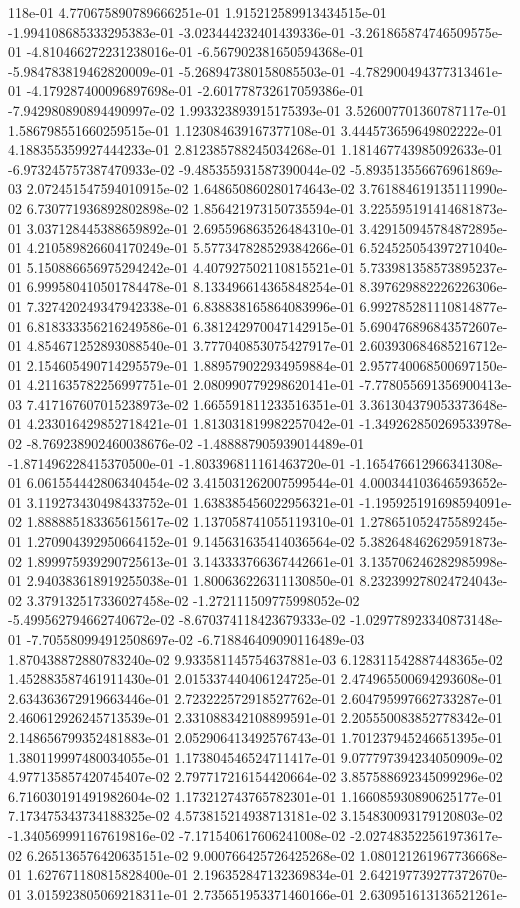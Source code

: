 118e-01	4.770675890789666251e-01	1.915212589913434515e-01	-1.994108685333295383e-01	-3.023444232401439336e-01	-3.261865874746509575e-01	-4.810466272231238016e-01	-6.567902381650594368e-01	-5.984783819462820009e-01	-5.268947380158085503e-01	-4.782900494377313461e-01	-4.179287400096897698e-01	-2.601778732617059386e-01	-7.942980890894490997e-02	1.993323893915175393e-01	3.526007701360787117e-01	1.586798551660259515e-01	1.123084639167377108e-01	3.444573659649802222e-01	4.188355359927444233e-01	2.812385788245034268e-01	1.181467743985092633e-01	-6.973245757387470933e-02	-9.485355931587390044e-02	-5.893513556676961869e-03	2.072451547594010915e-02	1.648650860280174643e-02	3.761884619135111990e-02	6.730771936892802898e-02	1.856421973150735594e-01	3.225595191414681873e-01	3.037128445388659892e-01	2.695596863526484310e-01	3.429150945784872895e-01	4.210589826604170249e-01	5.577347828529384266e-01	6.524525054397271040e-01	5.150886656975294242e-01	4.407927502110815521e-01	5.733981358573895237e-01	6.999580410501784478e-01	8.133496614365848254e-01	8.397629882226226306e-01	7.327420249347942338e-01	6.838838165864083996e-01	6.992785281110814877e-01	6.818333356216249586e-01	6.381242970047142915e-01	5.690476896843572607e-01	4.854671252893088540e-01	3.777040853075427917e-01	2.603930684685216712e-01	2.154605490714295579e-01	1.889579022934959884e-01	2.957740068500697150e-01	4.211635782256997751e-01	2.080990779298620141e-01	-7.778055691356900413e-03	7.417167607015238973e-02	1.665591811233516351e-01	3.361304379053373648e-01	4.233016429852718421e-01	1.813031819982257042e-01	-1.349262850269533978e-02	-8.769238902460038676e-02	-1.488887905939014489e-01	-1.871496228415370500e-01	-1.803396811161463720e-01	-1.165476612966341308e-01	6.061554442806340454e-02	3.415031262007599544e-01	4.000344103646593652e-01	3.119273430498433752e-01	1.638385456022956321e-01	-1.195925191698594091e-02	1.888885183365615617e-02	1.137058741055119310e-01	1.278651052475589245e-01	1.270904392950664152e-01	9.145631635414036564e-02	5.382648462629591873e-02	1.899975939290725613e-01	3.143333766367442661e-01	3.135706246282985998e-01	2.940383618919255038e-01	1.800636226311130850e-01	8.232399278024724043e-02	3.379132517336027458e-02	-1.272111509775998052e-02	-5.499562794662740672e-02	-8.670374118423679333e-02	-1.029778923340873148e-01	-7.705580994912508697e-02	-6.718846409090116489e-03	1.870438872880783240e-02	9.933581145754637881e-03	6.128311542887448365e-02	1.452883587461911430e-01	2.015337440406124725e-01	2.474965500694293608e-01	2.634363672919663446e-01	2.723222572918527762e-01	2.604795997662733287e-01	2.460612926245713539e-01	2.331088342108899591e-01	2.205550083852778342e-01	2.148656799352481883e-01	2.052906413492576743e-01	1.701237945246651395e-01	1.380119997480034055e-01	1.173804546524711417e-01	9.077797394234050909e-02	4.977135857420745407e-02	2.797717216154420664e-02	3.857588692345099296e-02	6.716030191491982604e-02	1.173212743765782301e-01	1.166085930890625177e-01	7.173475343734188325e-02	4.573815214938713181e-02	3.154830093179120803e-02	-1.340569991167619816e-02	-7.171540617606241008e-02	-2.027483522561973617e-02	6.265136576420635151e-02	9.000766425726425268e-02	1.080121261967736668e-01	1.627671180815828400e-01	2.196352847132369834e-01	2.642197739277372670e-01	3.015923805069218311e-01	2.735651953371460166e-01	2.630951613136521261e-